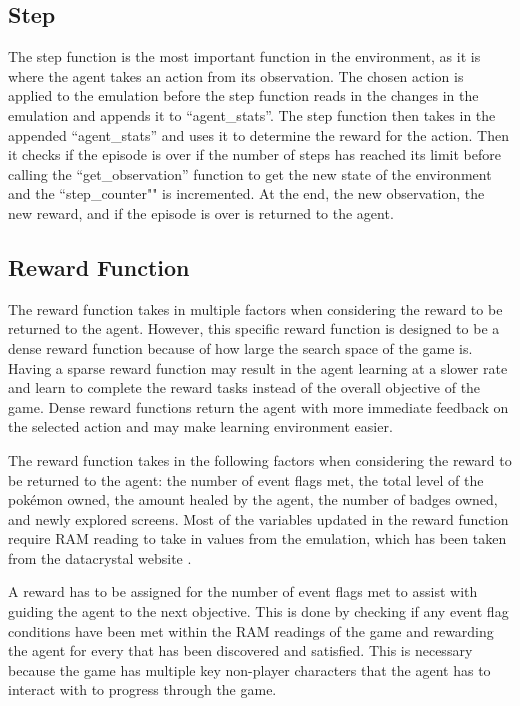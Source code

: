 \subsection{Step}

The step function is the most important function in the environment, as it is where the agent takes an action from its observation. The chosen action is applied to the emulation before the step function reads in the changes in the emulation and appends it to ``agent\_stats''. The step function then takes in the appended ``agent\_stats'' and uses it to determine the reward for the action. Then it checks if the episode is over if the number of steps has reached its limit before calling the ``get\_observation'' function to get the new state of the environment and the ``step\_counter"" is incremented. At the end, the new observation, the new reward, and if the episode is over is returned to the agent.

\subsection{Reward Function}

The reward function takes in multiple factors when considering the reward to be returned to the agent. However, this specific reward function is designed to be a dense reward function because of how large the search space of the game is. Having a sparse reward function may result in the agent learning at a slower rate and learn to complete the reward tasks instead of the overall objective of the game. Dense reward functions return the agent with more immediate feedback on the selected action and may make learning environment easier. 

The reward function takes in the following factors when considering the reward to be returned to the agent: the number of event flags met, the total level of the pokémon owned, the amount healed by the agent, the number of badges owned, and newly explored screens. Most of the variables updated in the reward function require RAM reading to take in values from the emulation, which has been taken from the datacrystal website \cite{datacrystal}.

A reward has to be assigned for the number of event flags met to assist with guiding the agent to the next objective. This is done by checking if any event flag conditions have been met within the RAM readings of the game and rewarding the agent for every that has been discovered and satisfied. This is necessary because the game has multiple key non-player characters that the agent has to interact with to progress through the game. 

